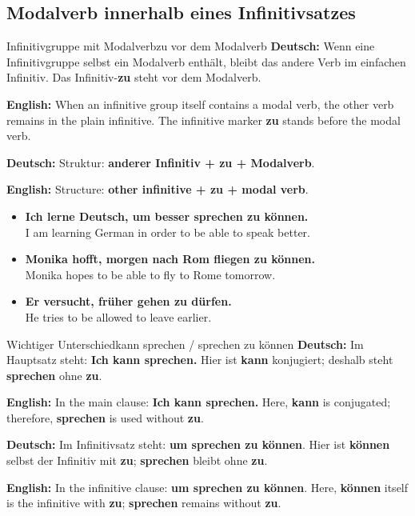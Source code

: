 \documentclass[a4paper,11pt]{article}
\newcommand{\GermanText}[1]{\textbf{Deutsch: }#1\par}
\newcommand{\EnglishText}[1]{{\small\color{SoftGray}\textbf{English: }#1\par}}
\newcommand{\ExampleItem}[2]{\item \textbf{#1}\\{\small\color{SoftGray}#2}}
\begin{document}
        \subsection{Modalverb innerhalb eines Infinitivsatzes}

            \begin{grammarentry}{Infinitivgruppe mit Modalverb}{zu vor dem Modalverb}
                \GermanText{Wenn eine Infinitivgruppe selbst ein Modalverb enthält, bleibt das andere Verb im einfachen Infinitiv. Das Infinitiv-\textbf{zu} steht vor dem Modalverb.}
                \EnglishText{When an infinitive group itself contains a modal verb, the other verb remains in the plain infinitive. The infinitive marker \textbf{zu} stands before the modal verb.}

                \GermanText{Struktur: \textbf{anderer Infinitiv + zu + Modalverb}.}
                \EnglishText{Structure: \textbf{other infinitive + zu + modal verb}.}
            \end{grammarentry}

            \begin{exbox}
                \begin{itemize}
                    \ExampleItem{Ich lerne Deutsch, um besser sprechen zu können.}{I am learning German in order to be able to speak better.}
                    \ExampleItem{Monika hofft, morgen nach Rom fliegen zu können.}{Monika hopes to be able to fly to Rome tomorrow.}
                    \ExampleItem{Er versucht, früher gehen zu dürfen.}{He tries to be allowed to leave earlier.}
                \end{itemize}
            \end{exbox}

            \begin{grammarentry}{Wichtiger Unterschied}{kann sprechen / sprechen zu können}
                \GermanText{Im Hauptsatz steht: \textbf{Ich kann sprechen.} Hier ist \textbf{kann} konjugiert; deshalb steht \textbf{sprechen} ohne \textbf{zu}.}
                \EnglishText{In the main clause: \textbf{Ich kann sprechen.} Here, \textbf{kann} is conjugated; therefore, \textbf{sprechen} is used without \textbf{zu}.}

                \GermanText{Im Infinitivsatz steht: \textbf{um sprechen zu können}. Hier ist \textbf{können} selbst der Infinitiv mit \textbf{zu}; \textbf{sprechen} bleibt ohne \textbf{zu}.}
                \EnglishText{In the infinitive clause: \textbf{um sprechen zu können}. Here, \textbf{können} itself is the infinitive with \textbf{zu}; \textbf{sprechen} remains without \textbf{zu}.}
            \end{grammarentry}
\end{document}
